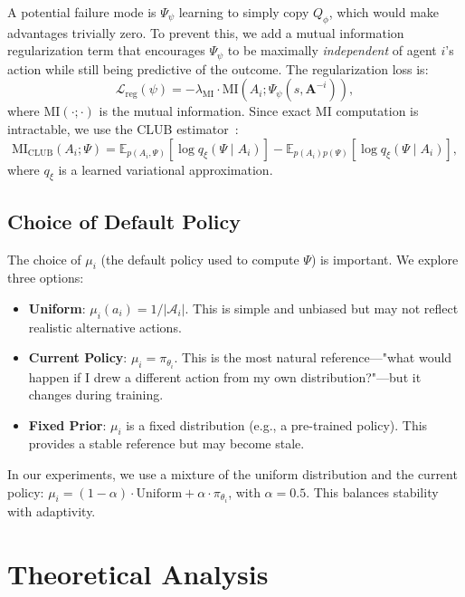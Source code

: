 \documentclass[journal]{IEEEtran}
\newcommand{\EE}{\mathbb{E}}
\begin{document}
A potential failure mode is $\Psi_\psi$ learning to simply copy $Q_\phi$, which would make advantages trivially zero. To prevent this, we add a mutual information regularization term that encourages $\Psi_\psi$ to be maximally \emph{independent} of agent $i$'s action while still being predictive of the outcome. The regularization loss is:
\begin{equation}
    \mathcal{L}_{\text{reg}}(\psi) = -\lambda_{\text{MI}} \cdot \text{MI}(A_i; \Psi_\psi(s, \mathbf{A}^{-i})),
\end{equation}
where $\text{MI}(\cdot;\cdot)$ is the mutual information. Since exact MI computation is intractable, we use the CLUB estimator~\cite{cheng2020club}:
\begin{equation}
    \text{MI}_{\text{CLUB}}(A_i; \Psi) = \EE_{p(A_i, \Psi)}\left[\log q_\xi(\Psi \mid A_i)\right] - \EE_{p(A_i)p(\Psi)}\left[\log q_\xi(\Psi \mid A_i)\right],
\end{equation}
where $q_\xi$ is a learned variational approximation.

\subsection{Choice of Default Policy}

The choice of $\mu_i$ (the default policy used to compute $\Psi$) is important. We explore three options:

\begin{itemize}
    \item \textbf{Uniform}: $\mu_i(a_i) = 1/|\mathcal{A}_i|$. This is simple and unbiased but may not reflect realistic alternative actions.
    \item \textbf{Current Policy}: $\mu_i = \pi_{\theta_i}$. This is the most natural reference---"what would happen if I drew a different action from my own distribution?"---but it changes during training.
    \item \textbf{Fixed Prior}: $\mu_i$ is a fixed distribution (e.g., a pre-trained policy). This provides a stable reference but may become stale.
\end{itemize}

In our experiments, we use a mixture of the uniform distribution and the current policy: $\mu_i = (1 - \alpha) \cdot \text{Uniform} + \alpha \cdot \pi_{\theta_i}$, with $\alpha = 0.5$. This balances stability with adaptivity.

\section{Theoretical Analysis}
\label{sec:theory}
\end{document}
